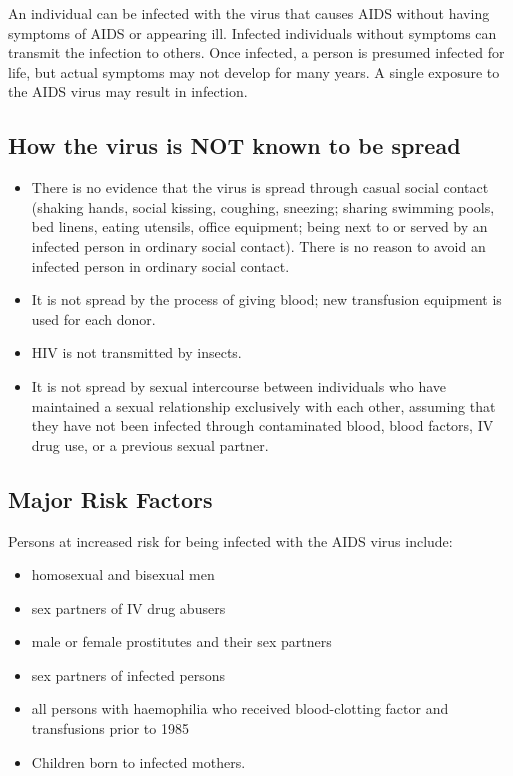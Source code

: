 An individual can be infected with the virus that causes AIDS without having symptoms of
AIDS or appearing ill. Infected individuals without symptoms can transmit the infection to
others. Once infected, a person is presumed infected for life, but actual symptoms may not
develop for many years. A single exposure to the AIDS virus may result in infection.

\subsection{How the virus is NOT known to be spread}

\begin{itemize}
\item There is no evidence that the virus is spread through casual social contact (shaking
hands, social kissing, coughing, sneezing; sharing swimming pools, bed linens, eating
utensils, office equipment; being next to or served by an infected person in ordinary social
contact). There is no reason to avoid an infected person in ordinary social contact.
\item It is not spread by the process of giving blood; new transfusion equipment is used for
each donor.
\item HIV is not transmitted by insects.
\item It is not spread by sexual intercourse between individuals who have maintained a sexual
relationship exclusively with each other, assuming that they have not been infected
through contaminated blood, blood factors, IV drug use, or a previous sexual partner.
\end{itemize}

\subsection{Major Risk Factors}

Persons at increased risk for being infected with the AIDS virus include:

\begin{itemize}
\item homosexual and bisexual men
\item sex partners of IV drug abusers
\item male or female prostitutes and their sex partners
\item sex partners of infected persons
\item all persons with haemophilia who received blood-clotting factor and transfusions prior to
1985
\item Children born to infected mothers.
\end{itemize}

